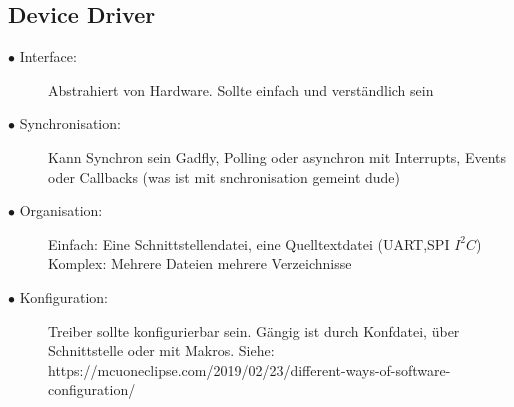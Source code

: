 \documentclass[a4paper, 8pt]{extarticle}
\begin{document}
\begin{multicols*}{3}
			\subsection{Device Driver}
				\begin{description}
					\item[$\bullet$ Interface:] Abstrahiert von Hardware. Sollte einfach und verständlich sein
					\item[$\bullet$ Synchronisation:] 
					Kann Synchron sein Gadfly, Polling oder asynchron mit Interrupts, Events oder Callbacks (was ist mit snchronisation gemeint dude)
					\item[$\bullet$ Organisation:]
					Einfach: Eine Schnittstellendatei, eine Quelltextdatei (UART,SPI $I^2C$)
					Komplex: Mehrere Dateien mehrere Verzeichnisse  
					\item[$\bullet$ Konfiguration:] Treiber sollte konfigurierbar sein. Gängig ist durch Konfdatei, über Schnittstelle oder mit Makros.
					Siehe:
					https://mcuoneclipse.com/2019/02/23/different-ways-of-software-configuration/
			\end{description}


\end{multicols*}
\end{document}
